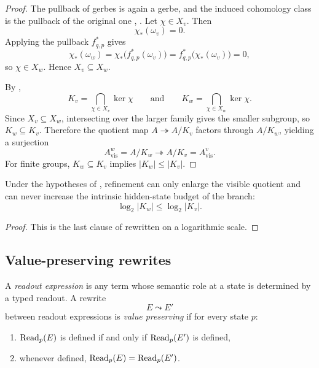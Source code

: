 \begin{proof}
The pullback of gerbes is again a gerbe, and the induced cohomology class is the pullback of the original one \cite[Tag 06NY]{StacksProject}, \cite[Theorem~3.11]{BerghSchnurer2021}. Let $\chi\in X_v$. Then
\[
\chi_*(\omega_v)=0.
\]
Applying the pullback $f_{q,p}^*$ gives
\[
\chi_*(\omega_w)=\chi_*\bigl(f_{q,p}^*(\omega_v)\bigr)=f_{q,p}^*\bigl(\chi_*(\omega_v)\bigr)=0,
\]
so $\chi\in X_w$. Hence $X_v\subseteq X_w$.

By ,
\[
K_v=\bigcap_{\chi\in X_v}\ker\chi
\qquad\text{and}\qquad
K_w=\bigcap_{\chi\in X_w}\ker\chi.
\]
Since $X_v\subseteq X_w$, intersecting over the larger family gives the smaller subgroup, so $K_w\subseteq K_v$. Therefore the quotient map $A\twoheadrightarrow A/K_v$ factors through $A/K_w$, yielding a surjection
\[
A_{\mathrm{vis}}^w=A/K_w\twoheadrightarrow A/K_v=A_{\mathrm{vis}}^v.
\]
For finite groups, $K_w\subseteq K_v$ implies $|K_w|\le |K_v|$.
\end{proof}

\begin{corollary}\label{cor:branch-budget-monotonicity}
Under the hypotheses of , refinement can only enlarge the visible quotient and can never increase the intrinsic hidden-state budget of the branch:
\[
\log_2|K_w|\le \log_2|K_v|.
\]
\end{corollary}

\begin{proof}
This is the last clause of  rewritten on a logarithmic scale.
\end{proof}

\subsection{Value-preserving rewrites}

\begin{definition}\label{def:value-preserving-rewrite}
A \emph{readout expression} is any term whose semantic role at a state is determined by a typed readout. A rewrite
\[
E\leadsto E'
\]
between readout expressions is \emph{value preserving} if for every state $p$:
\begin{enumerate}[label=(\roman*),nosep]
\item $\mathrm{Read}_p(E)$ is defined if and only if $\mathrm{Read}_p(E')$ is defined,
\item whenever defined, $\mathrm{Read}_p(E)=\mathrm{Read}_p(E')$.
\end{enumerate}
\end{definition}

